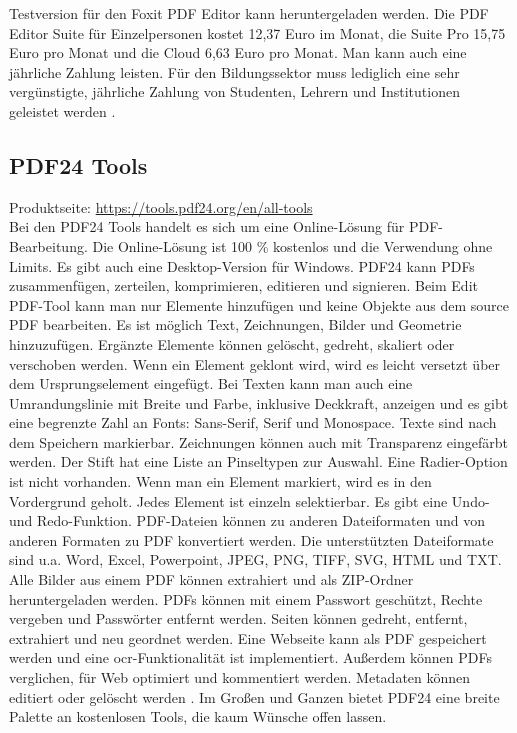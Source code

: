 Testversion für den Foxit PDF Editor kann heruntergeladen werden. Die PDF Editor Suite für Einzelpersonen kostet 12,37 Euro im Monat, die Suite Pro 15,75 Euro pro Monat und die Cloud 6,63 Euro pro Monat. Man kann auch eine jährliche Zahlung leisten. Für den Bildungssektor muss lediglich eine sehr vergünstigte, jährliche Zahlung von Studenten, Lehrern und Institutionen geleistet werden \cite{foxit-um}. 

\subsection{PDF24 Tools}
Produktseite: \url{https://tools.pdf24.org/en/all-tools} \\
Bei den PDF24 Tools handelt es sich um eine Online-Lösung für PDF-Bearbeitung. Die Online-Lösung ist 100 \% kostenlos und die Verwendung ohne Limits. Es gibt auch eine Desktop-Version für Windows. PDF24 kann PDFs zusammenfügen, zerteilen, komprimieren, editieren und signieren. Beim Edit PDF-Tool kann man nur Elemente hinzufügen und keine Objekte aus dem source PDF bearbeiten. Es ist möglich Text, Zeichnungen, Bilder und Geometrie hinzuzufügen. Ergänzte Elemente können gelöscht, gedreht, skaliert oder verschoben werden. Wenn ein Element geklont wird, wird es leicht versetzt über dem Ursprungselement eingefügt. Bei Texten kann man auch eine Umrandungslinie mit Breite und Farbe, inklusive Deckkraft, anzeigen und es gibt eine begrenzte Zahl an Fonts: Sans-Serif, Serif und Monospace. Texte sind nach dem Speichern markierbar. Zeichnungen können auch mit Transparenz eingefärbt werden. Der Stift hat eine Liste an Pinseltypen zur Auswahl. Eine Radier-Option ist nicht vorhanden. Wenn man ein Element markiert, wird es in den Vordergrund geholt. Jedes Element ist einzeln selektierbar. Es gibt eine Undo- und Redo-Funktion. PDF-Dateien können zu anderen Dateiformaten und von anderen Formaten zu PDF konvertiert werden. Die unterstützten Dateiformate sind u.a. Word, Excel, Powerpoint, JPEG, PNG, TIFF, SVG, HTML und TXT. Alle Bilder aus einem PDF können extrahiert und als ZIP-Ordner heruntergeladen werden. PDFs können mit einem Passwort geschützt, Rechte vergeben und Passwörter entfernt werden. Seiten können gedreht, entfernt, extrahiert und neu geordnet werden. Eine Webseite kann als PDF gespeichert werden und eine \gls{ocr}-Funktionalität ist implementiert. Außerdem können PDFs verglichen, für Web optimiert und kommentiert werden. Metadaten können editiert oder gelöscht werden \cite{pdf24}. Im Großen und Ganzen bietet PDF24 eine breite Palette an kostenlosen Tools, die kaum Wünsche offen lassen.

